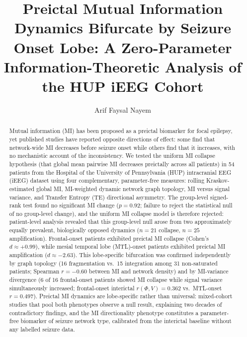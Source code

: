 \documentclass[a4paper,fleqn]{cas-dc}
\begin{document}
\let\WriteBookmarks\relax
\def\floatpagepagefraction{1}
\def\textpagefraction{.001}


\title[mode=title]{Preictal Mutual Information Dynamics Bifurcate by
  Seizure Onset Lobe: A Zero-Parameter
  Information-Theoretic Analysis of the HUP iEEG Cohort}

\author[1]{Arif Faysal Nayem}
\cormark[1]
\fnmark[1]



\begin{abstract}
Mutual information (MI) has been proposed as a preictal biomarker for
focal epilepsy, yet published studies have reported opposite directions
of effect: some find that network-wide MI decreases before seizure
onset while others find that it increases, with no mechanistic account
of the inconsistency.
%
We tested the uniform MI collapse hypothesis (that global mean pairwise
MI decreases preictally across all patients) in 54 patients from the
Hospital of the University of Pennsylvania (HUP) intracranial EEG
(iEEG) dataset using four complementary, parameter-free measures:
rolling Kraskov-estimated global MI, MI-weighted dynamic network graph
topology, MI versus signal variance, and Transfer Entropy (TE)
directional asymmetry.
%
The group-level signed-rank test found no significant MI change
($p = 0.92$; failure to reject the statistical null of no group-level
change), and the uniform MI collapse model is therefore rejected:
patient-level analysis revealed that this group-level null arose from
two approximately equally prevalent, biologically opposed dynamics
($n = 21$ collapse, $n = 25$ amplification).
%
Frontal-onset patients exhibited preictal MI collapse (Cohen's
$d \approx +0.99$), while mesial temporal lobe (MTL)-onset patients
exhibited preictal MI amplification ($d \approx -2.63$).
%
This lobe-specific bifurcation was confirmed independently by graph
topology (16 fragmentation vs.\ 15 integration among 31 non-saturated
patients; Spearman $r = -0.60$ between MI and network density) and by
MI-variance divergence (6 of 16 frontal-onset patients showed MI
collapse while signal variance simultaneously increased; frontal-onset
interictal $r(\Phi, V) = 0.362$ vs.\ MTL-onset $r = 0.497$).
%
Preictal MI dynamics are lobe-specific rather than universal: mixed-cohort
studies that pool both phenotypes observe a null result, explaining two
decades of contradictory findings, and the MI directionality phenotype
constitutes a parameter-free biomarker of seizure network type,
calibrated from the interictal baseline without any labelled seizure data.
\end{abstract}
\end{document}

